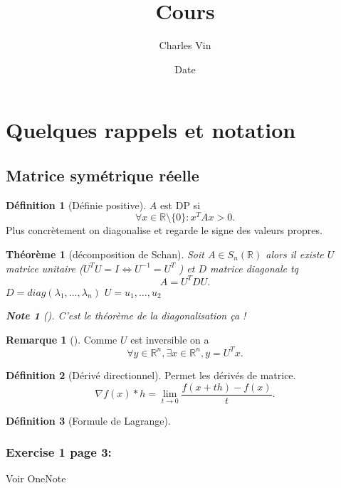 \documentclass{article}
\title{Cours}
\author{Charles Vin}
\date{Date}
\theoremstyle{plain}%
\newtheorem{thm}{Théorème}[section]
\theoremstyle{definition}
\newtheorem{defn}{Définition}[section]
\newtheorem*{rem}{Remarque}
\newtheorem*{note}{Note}
\begin{document}
\maketitle


\section{Quelques rappels et notation}
\subsection{Matrice symétrique réelle}
\begin{defn}[Définie positive]
    $ A $ est DP si 
    \[
        \forall x \in \mathbb{R}\setminus \{0\} : x^T A x > 0
    .\]
    Plus concrètement on diagonalise et regarde le signe des valeurs propres.
\end{defn}

\begin{thm}[décomposition de Schan]
    Soit $ A \in S_n(\mathbb{R}) $ alors il existe $ U $ matrice unitaire ($ U^TU=I \Leftrightarrow U^{-1}=U^T $ ) et $ D $ matrice diagonale tq 
    \[
        A=U^TDU
    .\]
    $ D=diag(\lambda _1, \dots, \lambda _n) $ 
    $ U={u_1,\dots,u_2} $ 
    \begin{note}[]
        C'est le théorème de la diagonalisation ça !
    \end{note}
\end{thm}
\begin{rem}[]
    Comme $ U $ est inversible on a 
    \[
        \forall y \in \mathbb{R}^n, \exists x \in \mathbb{R}^n, y=U^Tx
    .\]
\end{rem}

\begin{defn}[Dérivé directionnel]
    Permet les dérivés de matrice.
    \[
        \nabla f(x) * h = \lim_{t \to 0} \frac{f(x+th) - f(x)}{t}
    .\]
\end{defn}

\begin{defn}[Formule de Lagrange]
    
\end{defn}

\subsubsection{Exercise 1 page 3:}
Voir OneNote
\end{document}
